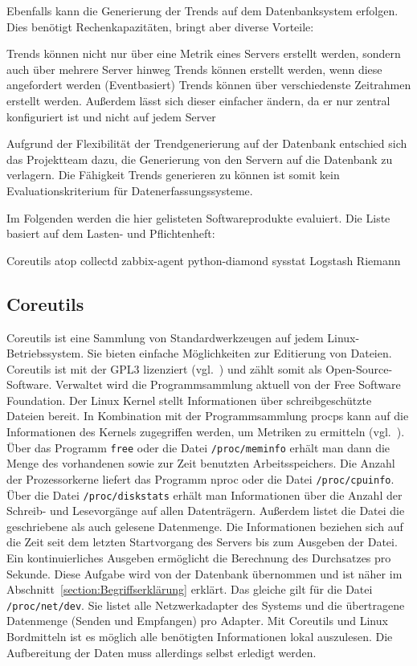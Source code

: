 Ebenfalls kann die Generierung der Trends auf dem Datenbanksystem erfolgen.
Dies benötigt Rechenkapazitäten, bringt aber diverse Vorteile:

\begin{outline}
  \1 Trends können nicht nur über eine Metrik eines Servers erstellt werden,
  sondern auch über mehrere Server hinweg
  \1 Trends können erstellt werden, wenn diese angefordert werden
  (Eventbasiert)
  \1 Trends können über verschiedenste Zeitrahmen erstellt werden. Außerdem
  lässt sich dieser einfacher ändern, da er nur zentral konfiguriert ist und
  nicht auf jedem Server
\end{outline}

Aufgrund der Flexibilität der Trendgenerierung auf der Datenbank entschied sich
das Projektteam dazu, die Generierung von den Servern auf die Datenbank zu
verlagern. Die Fähigkeit Trends generieren zu können ist somit kein
Evaluationskriterium für Datenerfassungssysteme.

Im Folgenden werden die hier gelisteten Softwareprodukte evaluiert. Die Liste
basiert auf dem Lasten- und Pflichtenheft:

\begin{outline}
  \1 Coreutils
  \1 atop
  \1 collectd
  \1 zabbix\hyp{}agent
  \1 python\hyp{}diamond
  \1 sysstat
  \1 Logstash
  \1 Riemann
\end{outline}
\tm%

\subsection{Coreutils}
Coreutils ist eine Sammlung von Standardwerkzeugen auf jedem
Linux\hyp{}Betriebssystem. Sie bieten einfache Möglichkeiten zur Editierung von
Dateien. Coreutils ist mit der GPL3 lizenziert (vgl.~\cite{coreutils}) und
zählt somit als Open\hyp{}Source\hyp{}Software. Verwaltet wird die
Programmsammlung aktuell von der Free Software Foundation. Der Linux Kernel
stellt Informationen über schreibgeschützte Dateien bereit. In Kombination mit
der Programmsammlung procps kann auf die Informationen des Kernels zugegriffen
werden, um Metriken zu ermitteln (vgl.~\cite{procps}). Über das Programm
\texttt{free} oder die Datei \texttt{/proc/meminfo} erhält man dann die Menge
des vorhandenen sowie zur Zeit benutzten Arbeitsspeichers. Die Anzahl der
Prozessorkerne liefert das Programm nproc oder die Datei
\texttt{/proc/cpuinfo}. Über die Datei \texttt{/proc/diskstats} erhält man
Informationen über die Anzahl der Schreib- und Lesevorgänge auf allen
Datenträgern. Außerdem listet die Datei die geschriebene als auch gelesene
Datenmenge. Die Informationen beziehen sich auf die Zeit seit dem letzten
Startvorgang des Servers bis zum Ausgeben der Datei. Ein kontinuierliches
Ausgeben ermöglicht die Berechnung des Durchsatzes pro Sekunde. Diese Aufgabe
wird von der Datenbank übernommen und ist näher im
Abschnitt~\ref{section:Begriffserklärung} erklärt. Das gleiche gilt für die
Datei \texttt{/proc/net/dev}. Sie listet alle Netzwerkadapter des Systems und
die übertragene Datenmenge (Senden und Empfangen) pro Adapter. Mit Coreutils
und Linux Bordmitteln ist es möglich alle benötigten Informationen lokal
auszulesen. Die Aufbereitung der Daten muss allerdings selbst erledigt werden.


